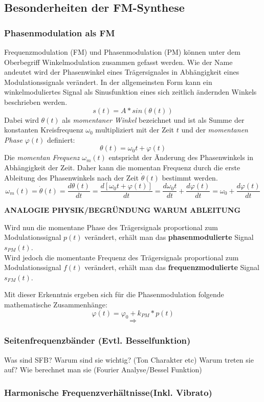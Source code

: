 \subsection{Besonderheiten der FM-Synthese}

\subsubsection{Phasenmodulation als FM}
Frequenzmodulation (FM) und Phasenmodulation (PM) können unter dem Oberbegriff Winkelmodulation zusammen gefasst werden. Wie der Name andeutet wird der Phasenwinkel eines Trägersignales in Abhängigkeit eines Modulationssignals verändert. In der allgemeinsten Form kann ein winkelmoduliertes Signal als Sinusfunktion eines sich zeitlich ändernden Winkels beschrieben werden.
\begin{equation}
s(t)=A*sin(\theta(t))
\end{equation}
Dabei wird $\theta(t)$ als \textit{momentaner Winkel} bezeichnet und ist als Summe der konstanten Kreisfrequenz $\omega_0$ multipliziert mit der Zeit $t$ und der \textit{momentanen Phase} $\varphi(t)$ definiert:
\begin{equation}
\theta(t)=\omega_0t + \varphi(t)
\end{equation}
Die \textit{momentan Frequenz} $\omega_m(t)$ entspricht der Änderung des Phasenwinkels in Abhängigkeit der Zeit. Daher kann die momentan Frequenz durch die erste Ableitung des Phasenwinkels nach der Zeit $\dot \theta(t)$ bestimmt werden.
\begin{equation}
\omega_m(t)=\dot \theta(t)=\frac{d\theta(t)}{dt}=\frac{d[\omega_0t+\varphi(t)]}{dt}=\frac{d\omega_0t}{dt}+\frac{d\varphi(t)}{dt}=\omega_0+\frac{d\varphi(t)}{dt}
\end{equation}


\textbf{ANALOGIE PHYSIK/BEGRÜNDUNG WARUM ABLEITUNG}

Wird nun die momentane Phase des Trägersignals proportional zum Modulationssignal $p(t)$ verändert, erhält man das \textbf{phasenmodulierte} Signal $s_{PM}(t)$.\\
Wird jedoch die momentante Frequenz des Trägersignals proportional zum Modulationssignal $f(t)$ verändert, erhält man das \textbf{frequenzmodulierte} Signal $s_{FM}(t)$.

Mit dieser Erkenntnis ergeben sich für die Phasenmodulation folgende mathematische Zusammenhänge:
\[
\varphi(t)=\varphi_0+k_{PM}*p(t)
\]
\[
\Rightarrow
\]

\subsubsection{Seitenfrequenzbänder (Evtl. Besselfunktion)}
Was sind SFB?
Warum sind sie wichtig? (Ton Charakter etc)
Warum treten sie auf?
Wie berechnet man sie (Fourier Analyse/Bessel Funktion)
\subsubsection{Harmonische Frequenzverhältnisse(Inkl. Vibrato)}